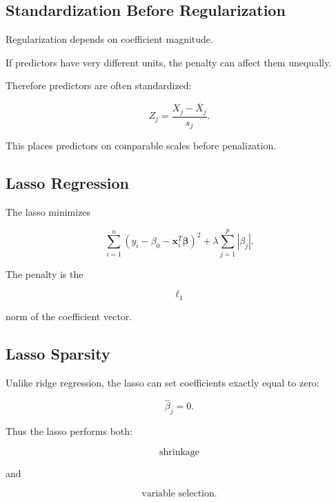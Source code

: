 \subsection{Standardization Before Regularization}
\label{subsec:standardization-regularization}

Regularization depends on coefficient magnitude.

If predictors have very different units, the penalty can affect them
unequally.

Therefore predictors are often standardized:

\[
\boxed{
Z_j
=
\frac{
X_j-\overline{X}_j
}{
s_j
}.
}
\]

This places predictors on comparable scales before penalization.

\subsection{Lasso Regression}
\label{subsec:lasso-regression}

The lasso minimizes

\[
\boxed{
\sum_{i=1}^{n}
(
y_i
-
\beta_0
-
\mathbf{x}_i^T
\boldsymbol{\beta}
)^2
+
\lambda
\sum_{j=1}^{p}
|\beta_j|.
}
\]

The penalty is the

\[
\ell_1
\]

norm of the coefficient vector.

\subsection{Lasso Sparsity}
\label{subsec:lasso-sparsity}

Unlike ridge regression, the lasso can set coefficients exactly equal to
zero:

\[
\boxed{
\widehat{\beta}_j=0.
}
\]

Thus the lasso performs both:

\[
\boxed{
\text{shrinkage}
}
\]

and

\[
\boxed{
\text{variable selection}.
}
\]

